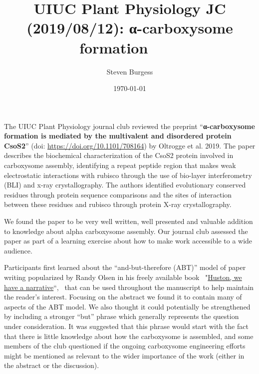 \documentclass[10pt]{article}
\begin{document}
\title{UIUC Plant Physiology JC (2019/08/12): α-carboxysome formation~~~~}



\author[1]{Steven Burgess}%
%


\vspace{-1em}



  \date{\today}


\begingroup
\let\center\flushleft
\let\endcenter\endflushleft
\maketitle
\endgroup









The UIUC Plant Physiology journal club reviewed the preprint
``\textbf{α-carboxysome formation is mediated by the multivalent and
disordered protein CsoS2}'' (doi: \url{https://doi.org/10.1101/708164})
by Oltrogge et al. 2019. The paper describes the biochemical
characterization of the CsoS2 protein involved in carboxysome assembly,
identifying a repeat peptide region that makes weak electrostatic
interactions with rubisco through the use of bio-layer interferometry
(BLI) and x-ray crystallography. The authors identified evolutionary
conserved residues through protein sequence comparisons and the sites of
interaction between these residues and rubisco through protein X-ray
crystallography.~~

\par\null

We found the paper to be very well written, well presented and valuable
addition to knowledge about alpha carboxysome assembly. Our journal club
assessed the paper as part of a learning exercise about how to make work
accessible to a wide audience.~

\par\null

Participants first learned about the ``and-but-therefore (ABT)'' model
of paper writing popularized by Randy Olsen in his freely available
book~
"\href{https://the-eye.eu/public//concen.org/UChicagoPress.Ebook.Pack-2016-PHC/9780226270708.UChicago\%20Press.Houston\%2C\%20We\%20Have\%20a\%20Narrative_\%20Why\%20Science\%20Needs\%20Story.Randy\%20Olson.Sep\%2C2015.pdf}{Huston,
we have a narrative}``,~ that can be used throughout the manuscript to
help maintain the reader's interest. Focusing on the abstract we found
it to contain many of aspects of the ABT model. We also thought it could
potentially be strengthened by including a stronger ``but'' phrase which
generally represents the question under consideration. It was suggested
that this phrase would start with the fact that there is little
knowledge about how the carboxysome is assembled, and some members of
the club questioned if the ongoing carboxysome engineering efforts might
be mentioned as relevant to the wider importance of the work (either in
the abstract or the discussion).
\end{document}
